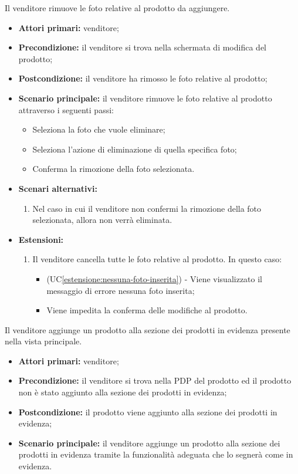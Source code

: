 Il venditore rimuove le foto relative al prodotto da aggiungere.
\begin{itemize}
    \item \textbf{Attori primari:} venditore;
    \item \textbf{Precondizione:} il venditore si trova nella schermata di modifica del prodotto;
    \item \textbf{Postcondizione:} il venditore ha rimosso le foto relative al prodotto;
    \item \textbf{Scenario principale:} il venditore rimuove le foto relative al prodotto attraverso i seguenti passi: 
    \begin{itemize}
        \item Seleziona la foto che vuole eliminare;
        \item Seleziona l'azione di eliminazione di quella specifica foto;
        \item Conferma la rimozione della foto selezionata.
    \end{itemize}
	\item \textbf{Scenari alternativi:}
	\begin{enumerate}[label=\lett]
		\item Nel caso in cui il venditore non confermi la rimozione della foto selezionata, allora non verrà eliminata.
	\end{enumerate}
    \item \textbf{Estensioni:}
    \begin{enumerate}[label=\lett]
    	\item Il venditore cancella tutte le foto relative al prodotto. In questo caso:
    	\begin{itemize}
    		\item (UC\ref{estensione:nessuna-foto-inserita}) - Viene visualizzato il messaggio di errore nessuna foto inserita;
    		\item Viene impedita la conferma delle modifiche al prodotto.
    	\end{itemize}
    \end{enumerate}
\end{itemize}

\label{aggiunta-prodotto-evidenza}

Il venditore aggiunge un prodotto alla sezione dei prodotti in evidenza presente nella vista principale.
\begin{itemize}
    \item \textbf{Attori primari:} venditore;
    \item \textbf{Precondizione:} il venditore si trova nella PDP del prodotto ed il prodotto non è stato aggiunto alla sezione dei prodotti in evidenza;
    \item \textbf{Postcondizione:} il prodotto viene aggiunto alla sezione dei prodotti in evidenza;
    \item \textbf{Scenario principale:} il venditore aggiunge un prodotto alla sezione dei prodotti in evidenza tramite la funzionalità adeguata che lo segnerà come in evidenza.
\end{itemize}

